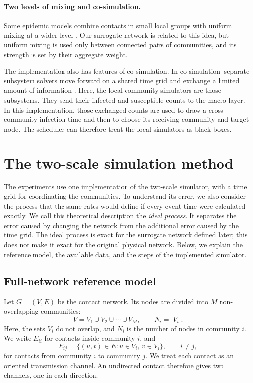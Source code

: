 \paragraph{Two levels of mixing and co-simulation.}
Some epidemic models combine contacts in small local groups with uniform mixing at a wider level \citep{ball1997}. Our surrogate network is related to this idea, but uniform mixing is used only between connected pairs of communities, and its strength is set by their aggregate weight.

The implementation also has features of co-simulation. In co-simulation, separate subsystem solvers move forward on a shared time grid and exchange a limited amount of information \citep{gomes2018cosim}. Here, the local community simulators are those subsystems. They send their infected and susceptible counts to the macro layer. In this implementation, those exchanged counts are used to draw a cross-community infection time and then to choose its receiving community and target node. The scheduler can therefore treat the local simulators as black boxes.

\clearpage

\section{The two-scale simulation method}
\label{sec:method}

The experiments use one implementation of the two-scale simulator, with a time grid for coordinating the communities. To understand its error, we also consider the process that the same rates would define if every event time were calculated exactly. We call this theoretical description the \emph{ideal process}. It separates the error caused by changing the network from the additional error caused by the time grid. The ideal process is exact for the surrogate network defined later; this does not make it exact for the original physical network. Below, we explain the reference model, the available data, and the steps of the implemented simulator.

\subsection{Full-network reference model}
\label{sec:reference}

Let $G=(V,E)$ be the contact network. Its nodes are divided into $M$ non-overlapping communities:
\begin{equation}
\label{eq:partition}
V=V_1\cup V_2\cup\cdots\cup V_M,
\qquad N_i=|V_i|.
\end{equation}
Here, the sets $V_i$ do not overlap, and $N_i$ is the number of nodes in community $i$. We write $E_{ii}$ for contacts inside community $i$, and
\[
E_{ij}=\{(u,v)\in E:u\in V_i,\,v\in V_j\},
\qquad i\neq j,
\]
for contacts from community $i$ to community $j$. We treat each contact as an oriented transmission channel. An undirected contact therefore gives two channels, one in each direction.

